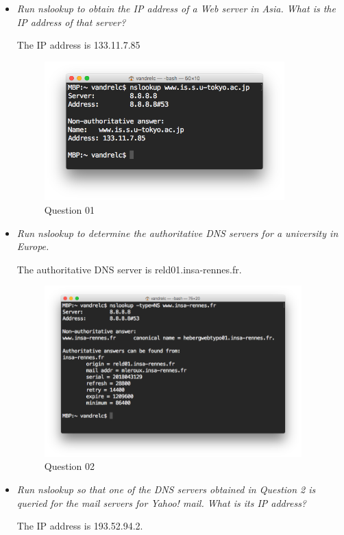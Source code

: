 \documentclass[11pt]{article}
\begin{document}
\begin{itemize}
	\setlength\itemsep{.5cm}

	\item
		\textit{Run nslookup to obtain the IP address of a Web server in Asia. What is the IP address of that server?}
		\par The IP address is 133.11.7.85
		
		\begin{figure}[H]
		\centering
		\caption{Question 01}
		\includegraphics[width=350px]{01}
		\end{figure}
	
	\pagebreak
	
	\item
		\textit{Run nslookup to determine the authoritative DNS servers for a university in Europe.}
		\par The authoritative DNS server is reld01.insa-rennes.fr.
		
		\begin{figure}[H]
		\centering
		\caption{Question 02}
		\includegraphics[width=375px]{02}
		\end{figure}
	
	\item
		\textit{Run nslookup so that one of the DNS servers obtained in Question 2 is queried for the mail
servers for Yahoo! mail. What is its IP address?}
		\par The IP address is 193.52.94.2.
		

\end{itemize}
\end{document}
